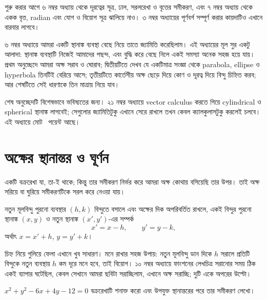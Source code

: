 \documentclass[11pt]{article}
\begin{document}

\noindent
শুরু করার আগে ৬ নম্বর অধ্যায় থেকে দূরত্বের সূত্র, ঢাল, সরলরেখা ও বৃত্তের
সমীকরণ, এবং ৭ নম্বর অধ্যায় থেকে একক বৃত্ত, radian এবং যোগ ও বিয়োগ সূত্র
ঝালিয়ে নাও। ৩ নম্বর অধ্যায়ের পূর্ণবর্গ সম্পূর্ণ করার কায়দাটিও এখানে বারবার
লাগবে।

৬ নম্বর অধ্যায়ে আমরা একটি স্থানাঙ্ক ব্যবস্থা বেছে নিয়ে তাতে জ্যামিতি
করেছিলাম। এই অধ্যায়ের মূল সুর একটু আলাদা: স্থানাঙ্ক ব্যবস্থাটি নিজেই আমাদের
পছন্দ, এবং বুদ্ধি করে বেছে নিলে একই সমস্যা অনেক সহজ হয়ে যায়। প্রথম অনুচ্ছেদে
আমরা অক্ষ সরাব ও ঘোরাব; দ্বিতীয়টিতে দেখব যে একটিমাত্র সংজ্ঞা থেকে parabola,
ellipse ও hyperbola তিনটিই বেরিয়ে আসে; তৃতীয়টিতে কার্তেসীয় অক্ষ ছেড়ে দিয়ে
কোণ ও দূরত্ব দিয়ে বিন্দু চিহ্নিত করব; আর শেষটিতে সেই ধারণাকে তিন মাত্রায় নিয়ে
যাব।

শেষ অনুচ্ছেদটি বিশেষভাবে ভবিষ্যতের জন্য। ২১ নম্বর অধ্যায়ে vector calculus
করতে গিয়ে cylindrical ও spherical স্থানাঙ্ক লাগবেই; সেগুলোর জ্যামিতিটুকু এখানে
সেরে রাখলে তখন কেবল ক্যালকুলাসটুকু করলেই চলবে। এই অধ্যায়ে মোট
\totalpoints\ পয়েন্ট আছে।

\section{অক্ষের স্থানান্তর ও ঘূর্ণন}

একটি বক্ররেখা যা, তা-ই থাকে; কিন্তু তার সমীকরণ নির্ভর করে আমরা অক্ষ কোথায়
বসিয়েছি তার উপর। তাই অক্ষ সরিয়ে বা ঘুরিয়ে সমীকরণটিকে সরল করে নেওয়া যায়।

\begin{idea}[অক্ষের স্থানান্তর]
নতুন মূলবিন্দু পুরনো ব্যবস্থার $(h,k)$ বিন্দুতে বসালে এবং অক্ষের দিক অপরিবর্তিত
রাখলে, একই বিন্দুর পুরনো স্থানাঙ্ক $(x,y)$ ও নতুন স্থানাঙ্ক $(x',y')$-এর সম্পর্ক
\[
  x' = x - h, \qquad y' = y - k ,
\]
অর্থাৎ $x = x' + h$, $y = y' + k$।
\end{idea}

চিহ্ন নিয়ে গুলিয়ে ফেলা এখানে খুব সাধারণ। মনে রাখার সহজ উপায়: নতুন মূলবিন্দু
ডান দিকে $h$ সরালে প্রতিটি বিন্দুকে নতুন ব্যবস্থায় $h$ কম দূরে মনে হবে, তাই
বিয়োগ। ১০ নম্বর অধ্যায়ে ফাংশনের লেখচিত্র সরানোর সময় ঠিক একই ব্যাপার ঘটেছিল,
কেবল সেখানে আমরা ছবিটা সরাচ্ছিলাম, এখানে অক্ষ সরাচ্ছি; দুটি একে অপরের উল্টো।

\begin{example}
$x^{2} + y^{2} - 6x + 4y - 12 = 0$ বক্ররেখাটি শনাক্ত করো এবং উপযুক্ত স্থানান্তরের
পরে তার সমীকরণ লেখো।
\end{example}
\end{document}
